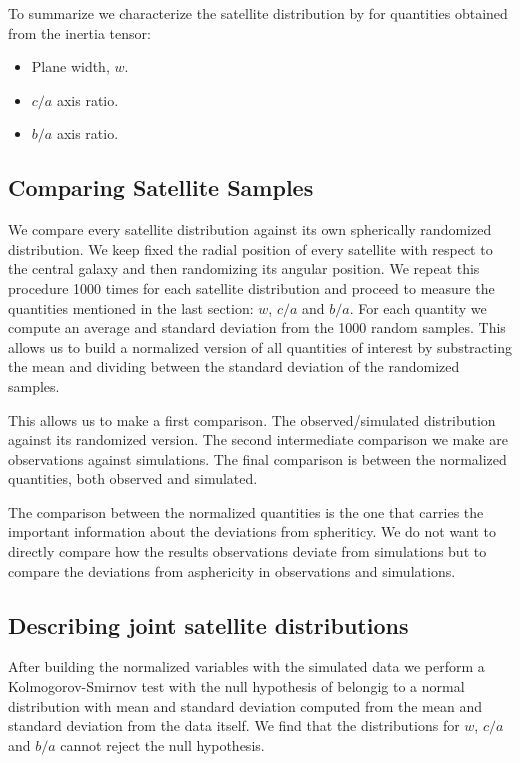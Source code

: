 \documentclass[a4paper,fleqn,usenatbib]{mnras}
\begin{document}
To summarize we characterize the satellite distribution by for
quantities obtained from the inertia tensor: 
\begin{itemize}
\item Plane width, $w$.
\item $c/a$ axis ratio.
\item $b/a$ axis ratio.
\end{itemize}


\subsection{Comparing Satellite Samples}

We compare every satellite distribution against its own spherically
randomized distribution.
We keep fixed the radial position of every satellite
with respect to the central galaxy and then randomizing its angular
position. 
We repeat this procedure 1000 times for each satellite distribution
and proceed to measure the quantities mentioned in the last section:
$w$, $c/a$ and $b/a$.
For each quantity we compute an average and standard deviation from
the 1000 random samples. 
This allows us to build a normalized version of all quantities of
interest by substracting the mean and dividing between the standard
deviation of the randomized samples.

This allows us to make a first comparison. 
The observed/simulated
distribution against its randomized version. 
The second intermediate comparison we make are observations against
simulations.
The final comparison is between the normalized quantities, both
observed and simulated.

The comparison between the normalized quantities is the one that
carries the important information about the deviations from
spheriticy. 
We do not want to directly compare how the results observations
deviate from simulations but to compare the deviations from
asphericity in observations and simulations. 


\subsection{Describing joint satellite distributions}

After building the normalized variables with the simulated data we
perform  a Kolmogorov-Smirnov test with the null hypothesis of belongig
to a normal distribution with mean and standard deviation computed
from the mean and standard deviation from the data itself. 
We find that the distributions for $w$, $c/a$ and $b/a$ cannot reject
the null hypothesis. 
\end{document}
